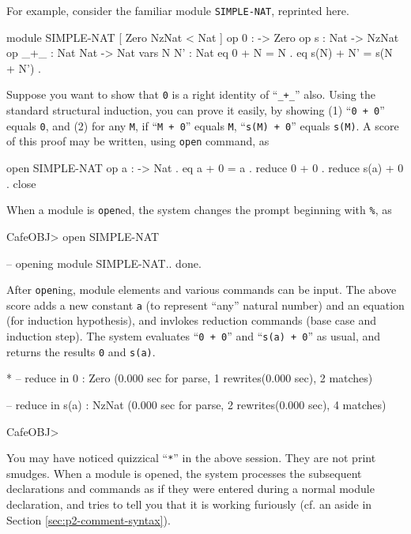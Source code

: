 \documentclass[a4paper]{memoir}
\begin{document}
For example, consider the familiar module \verb|SIMPLE-NAT|, reprinted here.
\begin{vvtm}
\begin{ccode}
  module SIMPLE-NAT {
    [ Zero NzNat < Nat ]
    op 0  : -> Zero
    op s : Nat -> NzNat 
    op _+_ : Nat Nat -> Nat
    vars N N' : Nat
    eq 0 + N = N .
    eq s(N) + N' = s(N + N') .
  }
\end{ccode}
\end{vvtm}
Suppose you want to show that \verb|0| is a right identity of ``\verb|_+_|''
also. Using the standard structural induction,
you can prove it easily, by
showing (1) ``\verb|0 + 0|'' equals \verb|0|, and (2) for any \verb|M|,
if ``\verb|M + 0|'' equals \verb|M|, \newline
``\verb|s(M) + 0|'' equals \verb|s(M)|.
A score of this proof may be written, using \verb|open| command, as
\begin{vvtm}
\begin{ccode}
  open SIMPLE-NAT
  op a : -> Nat .
  eq a + 0 = a .
  reduce 0 + 0 .
  reduce s(a) + 0 .
  close
\end{ccode}
\end{vvtm}
When a module is \verb|open|ed, the system changes the prompt beginning
with \verb|%|, as
\begin{vvtm}
\begin{ccode}
  CafeOBJ> open SIMPLE-NAT

  -- opening module SIMPLE-NAT.. done.

\end{ccode}
\end{vvtm}
After \verb|open|ing, module elements and various commands can be input.
The above score adds a new constant \verb|a| (to represent ``any''
natural number) and an equation (for induction hypothesis), and invlokes
reduction commands (base case and induction step). The system evaluates
``\verb|0 + 0|'' and ``\verb|s(a) + 0|'' as usual, and returns the results
\verb|0| and \verb|s(a)|.
\begin{vvtm}
\begin{ccode}


  *
  -- reduce in %
  0 : Zero
  (0.000 sec for parse, 1 rewrites(0.000 sec), 2 matches)

  -- reduce in %
  s(a) : NzNat
  (0.000 sec for parse, 2 rewrites(0.000 sec), 4 matches)

  CafeOBJ> 
\end{ccode}
\end{vvtm}
You may have noticed quizzical ``\verb|*|'' in the above
session. They are not print smudges.
When a module is opened, the system processes the subsequent
declarations and commands as if they were entered during a normal
module declaration, and tries to tell you that it is working
furiously (cf. an aside in Section \ref{sec:p2-comment-syntax}).
\end{document}
